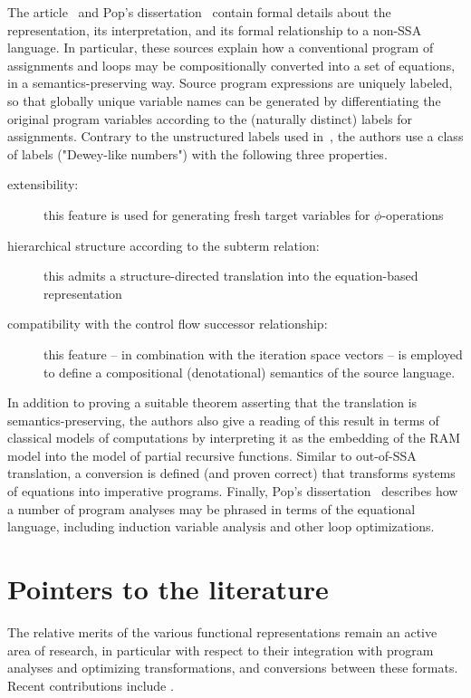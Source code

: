 The article~\cite{PopJS2007} and Pop's
dissertation~\cite{PopDissertation} contain formal details about the
representation, its interpretation, and its formal relationship to a
non-SSA language. In particular, these sources explain how a
conventional program of assignments and loops may be compositionally
converted into a set of equations, in a semantics-preserving
way. Source program expressions are uniquely labeled, so that globally
unique variable names can be generated by differentiating the original
program variables according to the (naturally distinct) labels for
assignments.  Contrary to the unstructured labels used
in~\cite{NielsonNielsonHanking:POPA}, the authors use a class of
labels ("Dewey-like numbers") with the following three properties.
\begin{description}
\item[extensibility:] this feature
is used for generating fresh target variables for $\phi$-operations
\item[hierarchical structure according to the subterm relation:]
   this admits a structure-directed translation into the
   equation-based representation
\item [compatibility with the control flow successor relationship:] 
  this feature -- in combination
with the iteration space vectors -- is employed to define a compositional
(denotational) semantics of the source language. 
\end{description}
In addition to proving a suitable theorem asserting that the
translation is semantics-preserving, the authors also give a reading
of this result in terms of classical models of computations by
interpreting it as the embedding of the RAM model into the model of
partial recursive functions. Similar to out-of-SSA translation, a
conversion is defined (and proven correct) that transforms systems of
equations into imperative programs. Finally, Pop's
dissertation~\cite{PopDissertation} describes how a number of program
analyses may be phrased in terms of the equational language, including
induction variable analysis and other loop optimizations.


\section{Pointers to the literature}
\label{section:Part1:Semantics:Discussion}

The relative merits of the various functional representations remain
an active area of research, in particular with respect to their
integration with program analyses and optimizing transformations, and
conversions between these formats. Recent contributions include
\cite{DBLP:journals/jfp/DanvyMN07,DBLP:journals/lisp/Reppy02,DBLP:conf/icfp/Kennedy07}.

